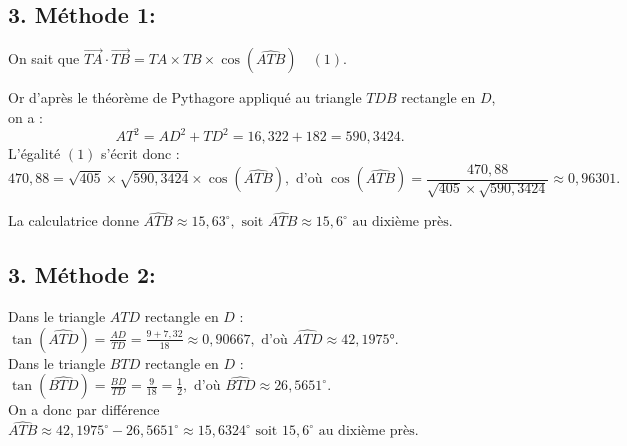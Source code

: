 	\subsection*{3. Méthode 1:}
	On sait que $\overrightarrow{TA} \cdot \overrightarrow{TB} = TA \times TB \times \cos (\widehat{ATB}) \quad(1)$.
	
	Or d’après le théorème de Pythagore appliqué au triangle $TDB$ rectangle en $D$, on a :
	\[
	AT^2 = AD^2 + TD^2 = 16,322 + 182 = 590,3424.
	\]
	L’égalité $(1)$ s’écrit donc :
	\[
	470,88 = \sqrt{405} \times \sqrt{590,3424} \times \cos (\widehat{ATB}), \text{ d’où }
	\cos (\widehat{ATB}) = \frac{470,88}{\sqrt{405} \times \sqrt{590,3424}} \approx 0,96301.
	\]
	
	La calculatrice donne $\widehat{ATB} \approx 15,63^{\circ}, \text{ soit } \widehat{ATB} \approx 15,6^{\circ} \text{ au dixième près.}$
	
	\subsection*{3. Méthode 2:}
	Dans le triangle $ATD$ rectangle en $D$ :\\
	$ \tan (\widehat{ATD}) = \frac{AD}{TD} = \frac{9+7,32}{18} \approx 0,90667, \text{ d’où } \widehat{ATD} \approx 42,1975°.$\\
	Dans le triangle $BTD$ rectangle en $D$ :\\
	$ \tan (\widehat{BTD}) = \frac{BD}{TD} = \frac{9}{18} = \frac{1}{2}, \text{ d’où } \widehat{BTD} \approx 26,5651^{\circ}.$\\
	On a donc par différence $\widehat{ATB} \approx 42,1975^{\circ} - 26,5651^{\circ} \approx 15,6324^{\circ} \text{ soit } 15,6^{\circ} \text{ au dixième près.}$
